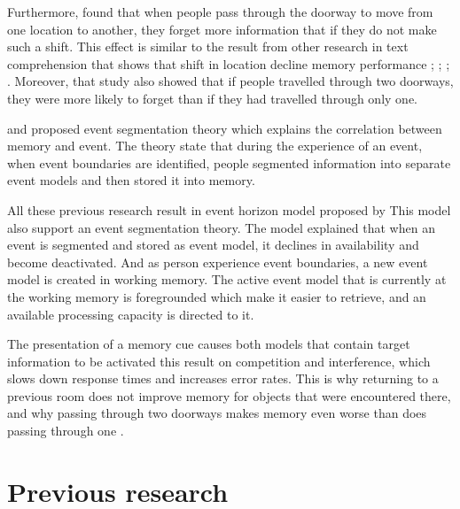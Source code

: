 
Furthermore, \cite{Radvansky2010} found that when people pass through the doorway to move from
one location to another, they forget more information that if they do not make such a shift. This
effect is similar to the result from other research in text comprehension that shows that shift
in location decline memory performance \citep{Curiel2002}; \citep{Haenggi1995}; \citep{Radvansky2010}; \citep{Radvansky2003}.
Moreover, that study also showed that if people travelled through two doorways, they were more
likely to forget than if they had travelled through only one.

\cite{Kurby2008} and \cite{Swallow2009} proposed event segmentation theory
which explains the correlation between memory and event.
 The theory state that during the experience of an event,
 when event boundaries are identified, people segmented information into separate event models and then stored it into memory.

All these previous research result in event horizon model proposed by \cite{Radvansky2012}
This model also support an event segmentation theory. The model explained that when an event is
segmented and stored as event model, it declines in availability and become deactivated. And
as person experience event boundaries, a new event model is created in working memory. The
active event model that is currently at the working memory is foregrounded which make it easier
to retrieve, and an available processing capacity is directed to it.

The presentation of a memory cue causes both models that contain target information to
be activated this result on competition and interference, which slows down response times and
increases error rates. This is why returning to a previous room does not improve memory for
objects that were encountered there, and why passing through two doorways makes memory even
worse than does passing through one \citep{Radvansky2011}.


\section{Previous research}

